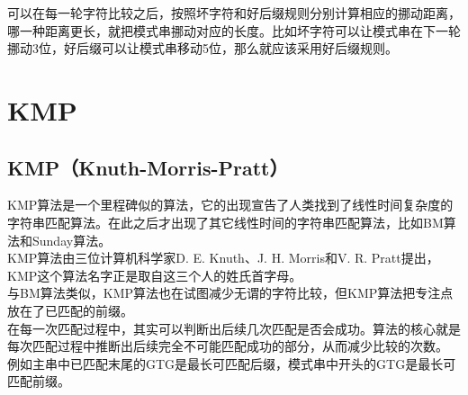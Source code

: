 可以在每一轮字符比较之后，按照坏字符和好后缀规则分别计算相应的挪动距离，哪一种距离更长，就把模式串挪动对应的长度。比如坏字符可以让模式串在下一轮挪动3位，好后缀可以让模式串移动5位，那么就应该采用好后缀规则。

\newpage

\section{KMP}

\subsection{KMP（Knuth-Morris-Pratt）}

KMP算法是一个里程碑似的算法，它的出现宣告了人类找到了线性时间复杂度的字符串匹配算法。在此之后才出现了其它线性时间的字符串匹配算法，比如BM算法和Sunday算法。 \\

KMP算法由三位计算机科学家D. E. Knuth、J. H. Morris和V. R. Pratt提出，KMP这个算法名字正是取自这三个人的姓氏首字母。 \\

与BM算法类似，KMP算法也在试图减少无谓的字符比较，但KMP算法把专注点放在了已匹配的前缀。 \\

在每一次匹配过程中，其实可以判断出后续几次匹配是否会成功。算法的核心就是每次匹配过程中推断出后续完全不可能匹配成功的部分，从而减少比较的次数。 \\

例如主串中已匹配末尾的GTG是最长可匹配后缀，模式串中开头的GTG是最长可匹配前缀。

\begin{table}[H]
	\centering
\end{table}

